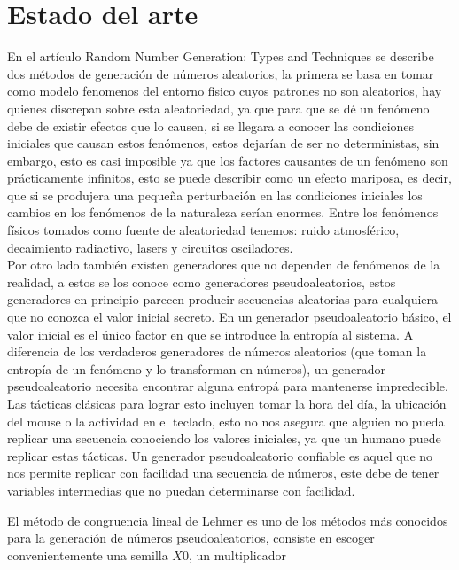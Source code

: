 \documentclass[conference]{IEEEtran}
\begin{document}
\section{Estado del arte}
En el art\'iculo Random Number Generation: Types and Techniques \cite{b2} se describe dos m\'etodos de generaci\'on de n\'umeros aleatorios, la primera se basa en tomar como modelo fenomenos del entorno fisico cuyos patrones no son aleatorios, hay quienes discrepan sobre esta aleatoriedad, ya que para que se d\'e un fen\'omeno debe de existir efectos que lo causen, si se llegara a conocer las condiciones iniciales que causan estos fen\'omenos, estos dejar\'ian de ser no deterministas, sin embargo, esto es casi imposible ya que los factores causantes de un fen\'omeno son pr\'acticamente infinitos, esto se puede describir como un efecto mariposa, es decir, que si se produjera una peque\~na perturbaci\'on en las condiciones iniciales los cambios en los fen\'omenos de la naturaleza ser\'ian enormes. Entre los fen\'omenos f\'isicos tomados como fuente de aleatoriedad tenemos: ruido atmosf\'erico, decaimiento radiactivo, lasers y circuitos osciladores.\\
Por otro lado tambi\'en existen generadores que no dependen de fen\'omenos de la realidad, a estos se los conoce como generadores pseudoaleatorios, estos generadores en principio parecen producir secuencias aleatorias para cualquiera que no conozca el valor inicial secreto. En un generador pseudoaleatorio b\'asico, el valor inicial es el \'unico factor en que se introduce la entrop\'ia al sistema. A diferencia de los verdaderos generadores de n\'umeros aleatorios (que toman la entrop\'ia de un fen\'omeno y lo transforman en n\'umeros), un generador pseudoaleatorio necesita encontrar alguna entrop\'a para mantenerse impredecible. Las t\'acticas cl\'asicas para lograr esto incluyen tomar la hora del d\'ia, la ubicaci\'on del mouse o la actividad en el teclado, esto no nos asegura que alguien no pueda replicar una secuencia conociendo los valores iniciales, ya que un humano puede replicar estas t\'acticas. Un generador pseudoaleatorio confiable es aquel que no nos permite replicar con facilidad una secuencia de n\'umeros, este debe de tener variables intermedias que no puedan determinarse con facilidad.

El m\'etodo de congruencia lineal de Lehmer \cite{b3} es uno de los m\'etodos m\'as conocidos para la generaci\'on de n\'umeros pseudoaleatorios, consiste en escoger convenientemente una semilla $X{0}$, un multiplicador  
\end{document}
